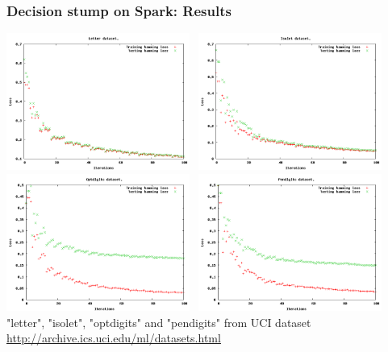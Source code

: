 \documentclass{beamer}
\begin{document}
\begin{frame}
\frametitle{Decision stump on Spark: Results}
\includegraphics[width=0.45\textwidth]{img/letter.png} \ 
\includegraphics[width=0.45\textwidth]{img/isolet.png} \\
\includegraphics[width=0.45\textwidth]{img/optdigits.png} \ 
\includegraphics[width=0.45\textwidth]{img/pendigits.png} \\
{ \small
    "letter", "isolet", "optdigits" and "pendigits" from UCI dataset \\
    \href{http://archive.ics.uci.edu/ml/datasets.html}{http://archive.ics.uci.edu/ml/datasets.html}
}
\end{frame}
\end{document}

